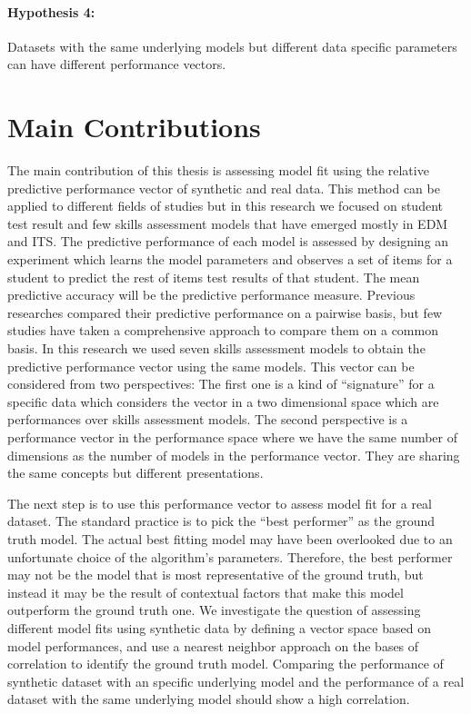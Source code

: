 \paragraph{Hypothesis 4:} Datasets with the same underlying  models but different data specific parameters can have different performance vectors.

\section{Main Contributions}

The main contribution of this thesis is assessing model fit using the relative predictive performance vector of synthetic and real data. This method can be applied to different fields of studies but in this research we focused on student test result and few skills assessment models that have emerged mostly in EDM and ITS. The predictive performance of each model is assessed by designing an experiment which learns the model parameters and observes a set of items for a student to predict the rest of items test results of that student. The mean predictive accuracy will be the predictive performance measure. Previous researches compared their predictive performance  on a pairwise basis, but few studies have taken a comprehensive approach to compare them on a common basis. In this research we used seven skills assessment models to obtain the predictive performance vector using the same models. This vector can be considered from two perspectives: The first one is a kind of ``signature'' for a specific data which considers the vector in a two dimensional space which are performances over skills assessment models. The second perspective is a performance vector in the performance space where we have the same number of dimensions as the number of models in the performance vector. They are sharing the same concepts but different presentations.

The next step is to use this performance vector to assess model fit for a real dataset. The standard practice is to pick the ``best performer'' as the ground truth model. The actual best fitting model may have been overlooked due to an unfortunate choice of the algorithm's parameters.  Therefore, the best performer may not be the model that is most representative of the ground truth, but instead it may be the result of contextual factors that make this model outperform the ground truth one. We investigate the question of assessing different model fits using synthetic data by defining a vector space based on model performances, and use a nearest neighbor approach on the bases of correlation to identify the ground truth model. Comparing the performance of synthetic dataset with an specific underlying model and the performance of a real dataset with the same underlying model should show a high correlation. 

